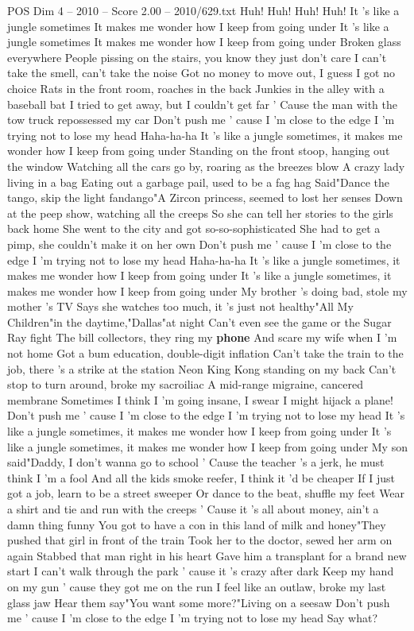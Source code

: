 \begin{textsample}{POS Dim 4 – 2010 – Score 2.00 – 2010/629.txt}  \label{ex:f4_pos_040}
Huh!
Huh!
Huh!
Huh!
It 's like a jungle sometimes It makes me wonder how I keep from going under It 's like a jungle sometimes It makes me wonder how I keep from going under Broken glass everywhere People pissing on the stairs, you know they just don't care I can't take the smell, can't take the noise Got no money to move out, I guess I got no choice Rats in the front room, roaches in the back Junkies in the alley with a baseball bat I tried to get away, but I couldn't get far ' Cause the man with the tow truck repossessed my car Don't push me ' cause I 'm close to the edge I 'm trying not to lose my head Haha-ha-ha It 's like a jungle sometimes, it makes me wonder how I keep from going under Standing on the front stoop, hanging out the window Watching all the cars go by, roaring as the breezes blow A crazy lady living in a bag Eating out a garbage pail, used to be a fag hag Said"Dance the tango, skip the light fandango"A Zircon princess, seemed to lost her senses Down at the peep show, watching all the creeps So she can tell her stories to the girls back home She went to the city and got so-so-sophisticated She had to get a pimp, she couldn't make it on her own Don't push me ' cause I 'm close to the edge I 'm trying not to lose my head Haha-ha-ha It 's like a jungle sometimes, it makes me wonder how I keep from going under It 's like a jungle sometimes, it makes me wonder how I keep from going under My brother 's doing bad, stole my mother 's TV Says she watches too much, it 's just not healthy"All My Children"in the daytime,"Dallas"at night Can't even see the game or the Sugar Ray fight The bill collectors, they ring my \textbf{phone} And scare my wife when I 'm not home Got a bum education, double-digit inflation Can't take the train to the job, there 's a strike at the station Neon King Kong standing on my back Can't stop to turn around, broke my sacroiliac A mid-range migraine, cancered membrane Sometimes I think I 'm going insane, I swear I might hijack a plane!
Don't push me ' cause I 'm close to the edge I 'm trying not to lose my head It 's like a jungle sometimes, it makes me wonder how I keep from going under It 's like a jungle sometimes, it makes me wonder how I keep from going under My son said"Daddy, I don't wanna go to school ' Cause the teacher 's a jerk, he must think I 'm a fool And all the kids smoke reefer, I think it 'd be cheaper If I just got a job, learn to be a street sweeper Or dance to the beat, shuffle my feet Wear a shirt and tie and run with the creeps ' Cause it 's all about money, ain't a damn thing funny You got to have a con in this land of milk and honey"They pushed that girl in front of the train Took her to the doctor, sewed her arm on again Stabbed that man right in his heart Gave him a transplant for a brand new start I can't walk through the park ' cause it 's crazy after dark Keep my hand on my gun ' cause they got me on the run I feel like an outlaw, broke my last glass jaw Hear them say"You want some more?"Living on a seesaw Don't push me ' cause I 'm close to the edge I 'm trying not to lose my head Say what?

\end{textsample}
